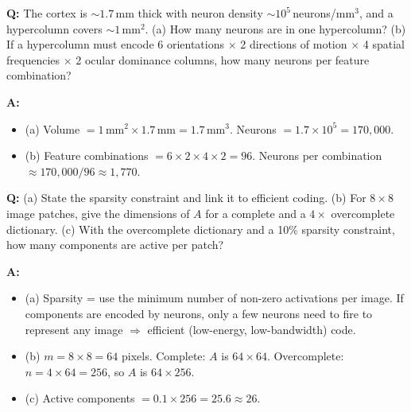 \begin{exbox}
\textbf{Q:} The cortex is $\sim 1.7$\,mm thick with neuron density $\sim 10^5$\,neurons/mm$^3$, and a hypercolumn covers $\sim 1$\,mm$^2$. (a) How many neurons are in one hypercolumn? (b) If a hypercolumn must encode 6 orientations $\times$ 2 directions of motion $\times$ 4 spatial frequencies $\times$ 2 ocular dominance columns, how many neurons per feature combination?

\textbf{A:}
\begin{itemize}
  \item (a) Volume $= 1\,\text{mm}^2 \times 1.7\,\text{mm} = 1.7\,\text{mm}^3$. Neurons $= 1.7 \times 10^5 = 170{,}000$.
  \item (b) Feature combinations $= 6\times 2\times 4\times 2 = 96$. Neurons per combination $\approx 170{,}000 / 96 \approx 1{,}770$.
\end{itemize}
\end{exbox}

\begin{exbox}
\textbf{Q:} (a) State the sparsity constraint and link it to efficient coding. (b) For $8\times 8$ image patches, give the dimensions of $A$ for a complete and a $4\times$ overcomplete dictionary. (c) With the overcomplete dictionary and a 10\% sparsity constraint, how many components are active per patch?

\textbf{A:}
\begin{itemize}
  \item (a) Sparsity = use the minimum number of non-zero activations per image. If components are encoded by neurons, only a few neurons need to fire to represent any image $\Rightarrow$ efficient (low-energy, low-bandwidth) code.
  \item (b) $m = 8\times 8 = 64$ pixels. Complete: $A$ is $64\times 64$. Overcomplete: $n = 4\times 64 = 256$, so $A$ is $64\times 256$.
  \item (c) Active components $= 0.1 \times 256 = 25.6 \approx 26$.
\end{itemize}
\end{exbox}

